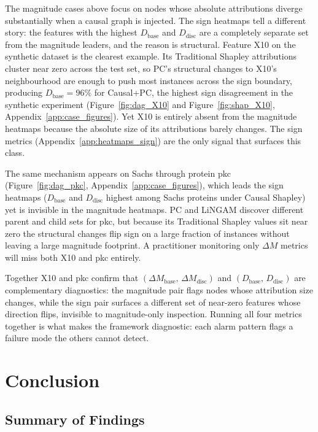 \documentclass[12pt,letterpaper,twocolumn]{article}
\begin{document}
The magnitude cases above focus on nodes whose absolute attributions diverge
substantially when a causal graph is injected. The sign heatmaps tell a different story:
the features with the highest $D_{\text{base}}$ and $D_{\text{disc}}$ are a completely
separate set from the magnitude leaders, and the reason is structural. Feature X10 on
the synthetic dataset is the clearest example. Its Traditional Shapley attributions
cluster near zero across the test set, so PC's structural changes to X10's neighbourhood
are enough to push most instances across the sign boundary, producing $D_{\text{base}} =
96\%$ for Causal+PC, the highest sign disagreement in the synthetic experiment
(Figure~\ref{fig:dag_X10} and Figure~\ref{fig:shap_X10}, Appendix~\ref{app:case_figures}).
Yet X10 is entirely absent from the magnitude heatmaps because the absolute size of its
attributions barely changes. The sign metrics (Appendix~\ref{app:heatmaps_sign}) are
the only signal that surfaces this class.

The same mechanism appears on Sachs through protein pkc (Figure~\ref{fig:dag_pkc}, Appendix~\ref{app:case_figures}), which leads the sign heatmaps
($D_{\text{base}}$ and $D_{\text{disc}}$ highest among Sachs proteins under Causal
Shapley) yet is invisible in the magnitude heatmaps. PC and LiNGAM discover different
parent and child sets for pkc, but because its Traditional Shapley values sit near zero
the structural changes flip sign on a large fraction of instances without leaving a
large magnitude footprint. A practitioner monitoring only $\Delta M$ metrics will miss
both X10 and pkc entirely.

Together X10 and pkc confirm that $(\Delta M_{\text{base}},\,\Delta M_{\text{disc}})$
and $(D_{\text{base}},\,D_{\text{disc}})$ are complementary diagnostics: the magnitude
pair flags nodes whose attribution size changes, while the sign pair surfaces a different
set of near-zero features whose direction flips, invisible to magnitude-only inspection.
Running all four metrics together is what makes the framework diagnostic: each alarm
pattern flags a failure mode the others cannot detect.

\section{Conclusion}
\label{sec:conclusion}

\subsection{Summary of Findings}
\end{document}
